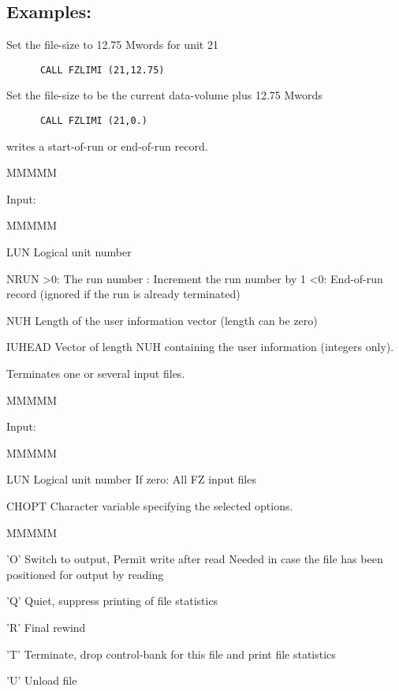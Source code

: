 \subsection{Examples:}
\par Set the file-size to 12.75 Mwords for unit 21
\begin{verbatim}
      CALL FZLIMI (21,12.75)
\end{verbatim}
Set the file-size to be the current data-volume plus 12.75 Mwords
\begin{verbatim}
      CALL FZLIMI (21,0.)
\end{verbatim}
\par writes a start-of-run or end-of-run record.
\begin{DL}{MMMMM}
\item[Input:
]
\begin{DL}{MMMMM}
\item[LUN
]Logical unit number
\item[NRUN
]>0: The run number
: Increment the run number by 1
\newline <0: End-of-run record
(ignored if the run is already terminated)
\item[NUH
]Length of the user information vector (length can be zero)
\item[IUHEAD
]Vector of length NUH containing the user information (integers only).
\end{DL}
\end{DL}
\par Terminates one or several input files.
\begin{DL}{MMMMM}
\item[Input:
]
\begin{DL}{MMMMM}
\item[LUN
]Logical unit number
\newline If zero: All FZ input files
\item[CHOPT
]Character variable specifying the selected options.
\begin{DL}{MMMMM}
\item['O'
]Switch to output,
\newline Permit write after read
\newline Needed in case the file
has been positioned for output by reading
\item['Q'
]Quiet, suppress printing of file statistics
\item['R'
]Final rewind
\item['T'
]Terminate, drop control-bank for this file
and print file statistics
\item['U'
]Unload file
\end{DL}
\end{DL}
\end{DL}
